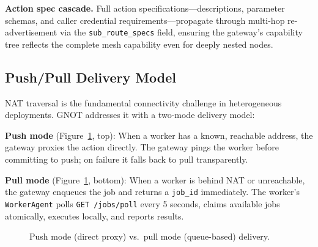 \documentclass[10pt,twocolumn]{article}
\begin{document}
\textbf{Action spec cascade.} Full action specifications---descriptions,
parameter schemas, and caller credential requirements---propagate through
multi-hop re-advertisement via the \texttt{sub\_route\_specs} field,
ensuring the gateway's capability tree reflects the complete mesh
capability even for deeply nested nodes.

\subsection{Push/Pull Delivery Model}
\label{sec:pushpull}

NAT traversal is the fundamental connectivity challenge in heterogeneous
deployments. GNOT addresses it with a two-mode delivery model:

\textbf{Push mode} (Figure~\ref{fig:pushpull}, top): When a worker has
a known, reachable address, the gateway proxies the action directly. The
gateway pings the worker before committing to push; on failure it falls
back to pull transparently.

\textbf{Pull mode} (Figure~\ref{fig:pushpull}, bottom): When a worker
is behind NAT or unreachable, the gateway enqueues the job and returns a
\texttt{job\_id} immediately. The worker's \texttt{WorkerAgent} polls
\texttt{GET /jobs/poll} every 5 seconds, claims available jobs
atomically, executes locally, and reports results.

\begin{figure}[tp]
\centering
{}%
\caption{Push mode (direct proxy) vs.\ pull mode (queue-based) delivery.}
\label{fig:pushpull}
\end{figure}
\end{document}
